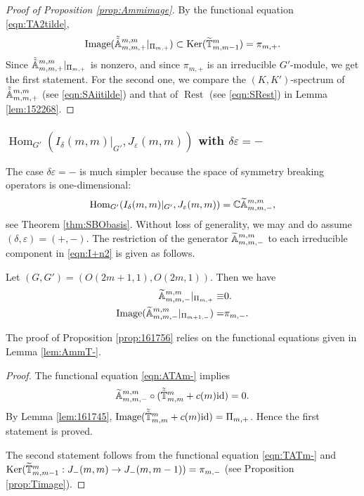 \begin{proof}
[Proof of Proposition \ref{prop:Ammimage}]
By the functional equation \eqref{eqn:TA2tilde}, 
\[
  {\operatorname{Image}}
  (\tilde{\tilde{{\mathbb{A}}}}_{{m},{m},{+}}^{{m,m}}|_{\Pi_{m,+}})
  \subset
  {\operatorname{Ker}}
  (\widetilde{{\mathbb{T}}}_{{m},{m-1}}^{{m}})
  =\pi_{m,+}.  
\]
Since $\tilde{\tilde{{\mathbb{A}}}}_{{m},{m},{+}}^{{m,m}}|_{\Pi_{m,+}}$ is nonzero, 
 and since $\pi_{m,+}$ is an irreducible $G'$-module, 
 we get the first statement.  
For the second one, 
 we compare the $(K,K')$-spectrum
 of $\tilde{\tilde{{\mathbb{A}}}}_{{m},{m},{+}}^{{m,m}}$
 (see \eqref{eqn:SAiitilde})
 and that of ${\operatorname{Rest}}$
 (see \eqref{eqn:SRest}) in Lemma \ref{lem:152268}.  
\end{proof}



\subsubsection
{${\operatorname{Hom}}_{G'}(I_\delta(m,m)|_{G'},J_\varepsilon(m,m))$
 with $\delta \varepsilon=-$}
\label{subsec:IJmm-}
The case $\delta \varepsilon=-$ is much simpler 
 because the space of symmetry breaking operators
 is one-dimensional:
\[
   {\operatorname{Hom}}_{G'}(I_\delta(m,m)|_{G'},J_\varepsilon (m,m))
   =
   {\mathbb{C}} {\widetilde{\mathbb{A}}}_{{m},{m},{-}}^{{m,m}}, 
\]
 see Theorem \ref{thm:SBObasis}.  
Without loss of generality,
 we may and do assume 
 $(\delta, \varepsilon)=(+,-)$.  
The restriction of the generator ${\widetilde{\mathbb{A}}}_{{m},{m},{-}}^{{m,m}}$
 to each irreducible component in \eqref{eqn:I+n2}
 is given as follows.  
\begin{proposition}
\label{prop:161756}
Let $(G,G')=(O(2m+1,1),O(2m,1))$.  
Then we have
\begin{align*}
{\widetilde{\mathbb{A}}}_{{m},{m},{-}}^{{m,m}}|_{\Pi_{m,+}}\equiv & 0.  
\\
{\operatorname{Image}}({\widetilde{\mathbb{A}}}_{{m},{m},{-}}^{{m,m}}|_{\Pi_{m+1,-}}) = & \pi_{m,-}.  
\end{align*}
\end{proposition}

The proof of Proposition \ref{prop:161756} relies 
 on the functional equations given in Lemma \ref{lem:AmmT-}.  

\begin{proof}
The functional equation \eqref{eqn:ATAm-} implies
\[
   {\widetilde{\mathbb{A}}}_{{m},{m},{-}}^{{m,m}} \circ (\tilde{\tilde{{\mathbb{T}}}}_{{m},{m}}^{{m}} + c(m){\operatorname{id}})
   =0.   
\]
By Lemma \ref{lem:161745}, 
 ${\operatorname{Image}}(\tilde{\tilde{{\mathbb{T}}}}_{{m},{m}}^{{m}} + c(m){\operatorname{id}})
 =\Pi_{m,+}$.  
Hence the first statement is proved.  



The second statement follows from the functional equation \eqref{eqn:TATm-}
 and ${\operatorname{Ker}}(\widetilde{{\mathbb{T}}}_{{m},{m-1}}^{{m}}: J_-(m,m) \to J_-(m,m-1))
 =\pi_{m,-}$
 (see Proposition \ref{prop:Timage}). 
\end{proof}

